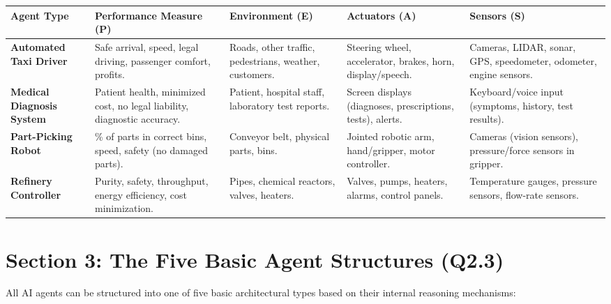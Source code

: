 \begin{table}[H]
\centering
\begin{tabular}{|p{}|p{}|p{}|p{}|p{}|}
\hline
Agent Type & Performance Measure (P) & Environment (E) & Actuators (A) & Sensors (S) \\
\hline
\textbf{Automated Taxi Driver} & Safe arrival, speed, legal driving, passenger comfort, profits. & Roads, other traffic, pedestrians, weather, customers. & Steering wheel, accelerator, brakes, horn, display/speech. & Cameras, LIDAR, sonar, GPS, speedometer, odometer, engine sensors. \\
\hline
\textbf{Medical Diagnosis System} & Patient health, minimized cost, no legal liability, diagnostic accuracy. & Patient, hospital staff, laboratory test reports. & Screen displays (diagnoses, prescriptions, tests), alerts. & Keyboard/voice input (symptoms, history, test results). \\
\hline
\textbf{Part-Picking Robot} & \% of parts in correct bins, speed, safety (no damaged parts). & Conveyor belt, physical parts, bins. & Jointed robotic arm, hand/gripper, motor controller. & Cameras (vision sensors), pressure/force sensors in gripper. \\
\hline
\textbf{Refinery Controller} & Purity, safety, throughput, energy efficiency, cost minimization. & Pipes, chemical reactors, valves, heaters. & Valves, pumps, heaters, alarms, control panels. & Temperature gauges, pressure sensors, flow-rate sensors. \\
\hline
\end{tabular}
\end{table}


\section{Section 3: The Five Basic Agent Structures (Q2.3)}

All AI agents can be structured into one of five basic architectural types based on their internal reasoning mechanisms:

